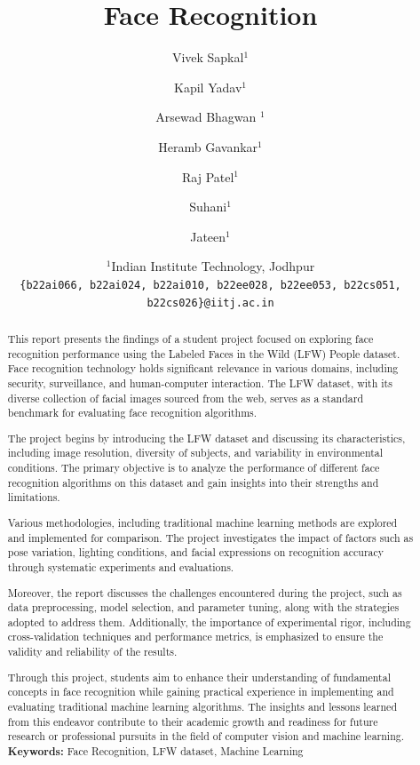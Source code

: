 \documentclass[a4paper]{article}
\title{Face Recognition}
\author{Vivek Sapkal$^1$ \and Kapil Yadav$^1$ \and Arsewad Bhagwan $^1$ \and Heramb Gavankar$^1$ \and Raj Patel$^1$ \and Suhani$^1$ \and Jateen$^1$}
\date{
	$^1$Indian Institute Technology, Jodhpur   \\ \texttt{\{b22ai066, b22ai024, b22ai010, b22ee028, b22ee053, b22cs051, b22cs026\}@iitj.ac.in}\\%
}
\theoremstyle{plain}
\theoremstyle{definition}
\begin{document}
	\maketitle
	
	\begin{abstract}

 
This report presents the findings of a student project focused on exploring face recognition performance using the Labeled Faces in the Wild (LFW) People dataset. Face recognition technology holds significant relevance in various domains, including security, surveillance, and human-computer interaction. The LFW dataset, with its diverse collection of facial images sourced from the web, serves as a standard benchmark for evaluating face recognition algorithms.

The project begins by introducing the LFW dataset and discussing its characteristics, including image resolution, diversity of subjects, and variability in environmental conditions. The primary objective is to analyze the performance of different face recognition algorithms on this dataset and gain insights into their strengths and limitations.

Various methodologies, including traditional machine learning methods are explored and implemented for comparison. The project investigates the impact of factors such as pose variation, lighting conditions, and facial expressions on recognition accuracy through systematic experiments and evaluations.

Moreover, the report discusses the challenges encountered during the project, such as data preprocessing, model selection, and parameter tuning, along with the strategies adopted to address them. Additionally, the importance of experimental rigor, including cross-validation techniques and performance metrics, is emphasized to ensure the validity and reliability of the results.

Through this project, students aim to enhance their understanding of fundamental concepts in face recognition while gaining practical experience in implementing and evaluating traditional machine learning algorithms. The insights and lessons learned from this endeavor contribute to their academic growth and readiness for future research or professional pursuits in the field of computer vision and machine learning.	
		\vspace{10cm}	
		\noindent\textbf{Keywords:} Face Recognition, LFW dataset, Machine Learning
	\end{abstract}
\end{document}
